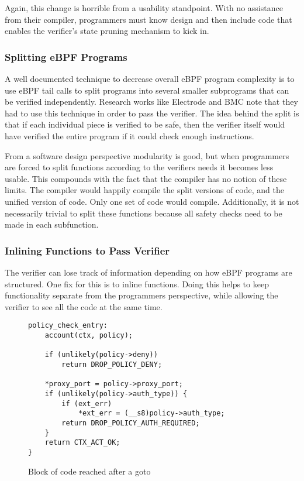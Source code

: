 Again, this change is horrible from a usability standpoint.
With no assistance from their compiler, programmers must know design and then include code that enables the verifier's state pruning mechanism to kick in.

\subsubsection{Splitting eBPF Programs}
A well documented technique to decrease overall eBPF program complexity is to use eBPF tail calls to split programs into several smaller subprograms that can be verified independently.
Research works like Electrode and BMC note that they had to use this technique in order to pass the verifier.
The idea behind the split is that if each individual piece is verified to be safe, then the verifier itself would have verified the entire program if it could check enough instructions.

From a software design perspective modularity is good, but when programmers are forced to split functions according to the verifiers needs it becomes less usable.
This compounds with the fact that the compiler has no notion of these limits.
The compiler would happily compile the split versions of code, and the unified version of code.
Only one set of code would compile.
Additionally, it is not necessarily trivial to split these functions because all safety checks need to be made in each subfunction.

\subsubsection{Inlining Functions to Pass Verifier}
The verifier can lose track of information depending on how eBPF programs are structured.
One fix for this is to inline functions.
Doing this helps to keep functionality separate from the programmers perspective, while allowing the verifier to see all the code at the same time.

\begin{figure}
    \begin{lstlisting}[language=myC]
policy_check_entry:
	account(ctx, policy);

	if (unlikely(policy->deny))
		return DROP_POLICY_DENY;

	*proxy_port = policy->proxy_port;
	if (unlikely(policy->auth_type)) {
		if (ext_err)
			*ext_err = (__s8)policy->auth_type;
		return DROP_POLICY_AUTH_REQUIRED;
	}
	return CTX_ACT_OK;
}
    \end{lstlisting}
    \caption{Block of code reached after a goto}
    \label{fig:inline-fig}
\end{figure}


